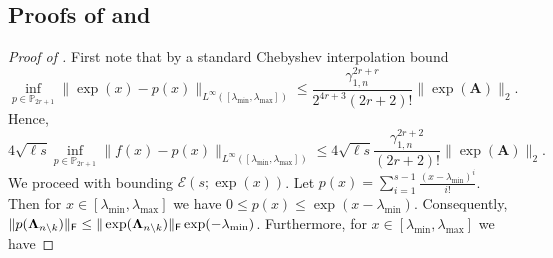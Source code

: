 \begin{appendices}
\section{Proofs of  and }\label{section:appendix}
\begin{proof}[Proof of ]
    First note that by a standard Chebyshev interpolation bound \cite[Lecture 20]{stewart}
    \begin{equation*}
        \inf\limits_{p \in \mathbb{P}_{2r+1}}\|\exp(x)-p(x)\|_{L^{\infty}([\lambda_{\min},\lambda_{\max}])}  \leq \frac{\gamma_{1,n}^{2r+r}}{2^{4r+3}(2r+2)!}\|\exp(\bm{A})\|_2.
    \end{equation*}
    Hence,
    \begin{equation*}
        4\sqrt{\ell s}  \inf\limits_{p \in \mathbb{P}_{2r+1}}\|f(x)-p(x)\|_{L^{\infty}([\lambda_{\min},\lambda_{\max}])} \leq 4\sqrt{\ell s} \frac{\gamma_{1,n}^{2r+2}}{(2r+2)!} \|\exp(\bm{A})\|_2.
    \end{equation*}
    We proceed with bounding $\mathcal{E}(s;\exp(x))$. Let $p(x) = \sum\limits_{i=1}^{s-1}\frac{(x-\lambda_{\min})^i}{i!}$. Then for $x \in [\lambda_{\min},\lambda_{\max}]$ we have $0 \leq p(x) \leq \exp(x-\lambda_{\min})$. Consequently, $\|p(\bm{\Lambda}_{n \setminus k })\|_{\textsf{\textup{F}}} \leq \|\exp(\bm{\Lambda}_{n \setminus k })\|_{\textsf{\textup{F}}} \exp(-\lambda_{\min})$. Furthermore, for $x \in [\lambda_{\min},\lambda_{\max}]$ we have

\end{proof}
\end{appendices}
